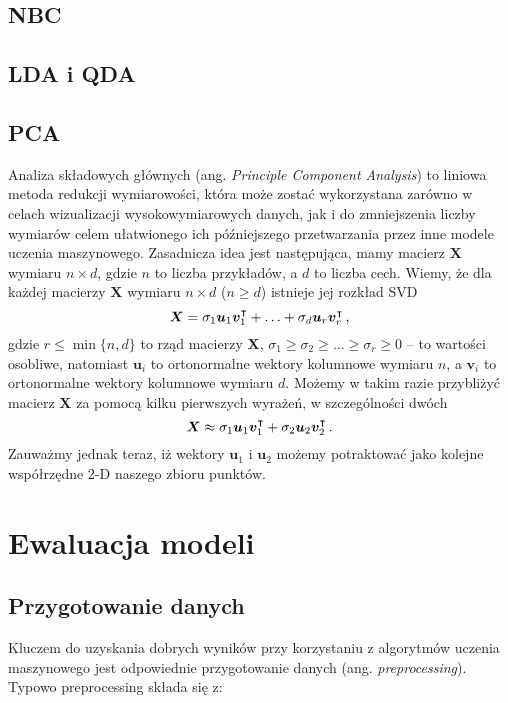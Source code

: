 \documentclass{myclass}
\begin{document}
\subsection{NBC}

\subsection{LDA i QDA}

\subsection{PCA}

Analiza składowych głównych (ang. \emph{Principle Component Analysis}) to liniowa metoda redukcji
wymiarowości, która może zostać wykorzystana zarówno w celach wizualizacji wysokowymiarowych danych,
jak i do zmniejszenia liczby wymiarów celem ułatwionego ich późniejszego przetwarzania przez inne
modele uczenia maszynowego. Zasadnicza idea jest następująca, mamy macierz \(\bm{X}\) wymiaru \(n
\times d\), gdzie \(n\) to liczba przykładów, a \(d\) to liczba cech. Wiemy, że dla każdej macierzy
\(\bm{X}\) wymiaru \(n \times d\) (\(n \geq d\)) istnieje jej rozkład SVD 
\[
    \bm{X} = \sigma_1 \bm{u}_1 \bm{v}_1^\intercal + \ldots + \sigma_d \bm{u}_{r} \bm{v}_r^\intercal\,,
\]
gdzie \(r \leq \min\{n,d\}\) to rząd macierzy \(\bm{X}\), \(\sigma_1 \geq \sigma_2 \geq \ldots \geq
\sigma_r \geq 0\) -- to wartości osobliwe, natomiast \(\bm{u}_i\) to ortonormalne wektory kolumnowe
wymiaru \(n\), a \(\bm{v}_i\) to ortonormalne wektory kolumnowe wymiaru \(d\). Możemy w takim razie
przybliżyć macierz \(\bm{X}\) za pomocą kilku pierwszych wyrażeń, w szczególności dwóch
\[
    \bm{X} \approx \sigma_1 \bm{u}_1 \bm{v}_1^\intercal + \sigma_2 \bm{u}_2 \bm{v}_2^\intercal\,.
\]
Zauważmy jednak teraz, iż wektory \(\bm{u}_1\) i \(\bm{u}_2\) możemy potraktować jako kolejne
współrzędne 2-D naszego zbioru punktów.


\section{Ewaluacja modeli}

\subsection{Przygotowanie danych}

Kluczem do uzyskania dobrych wyników przy korzystaniu z algorytmów uczenia maszynowego jest
odpowiednie przygotowanie danych (ang. \emph{preprocessing}). Typowo preprocessing składa się z:
\end{document}
